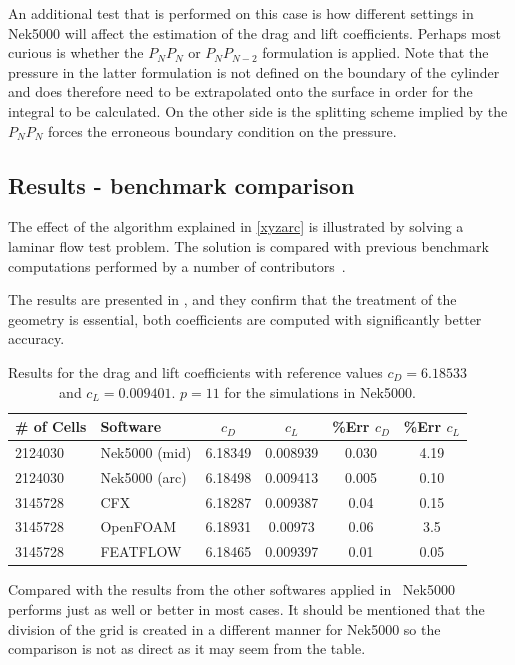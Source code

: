 An additional test that is performed on this case is how different settings in Nek5000 will affect the estimation of the drag and lift coefficients.
Perhaps most curious is whether the $P_NP_N$ or $P_NP_{N-2}$ formulation is applied. Note that the pressure in the latter formulation is 
not defined on the boundary of the cylinder and does therefore need to be extrapolated onto the surface in order for the integral to be 
calculated. On the other side is the splitting scheme implied by the $P_NP_N$ forces the erroneous boundary condition on the pressure.
%
\subsection{Results - benchmark comparison}
The effect of the algorithm explained in \cref{xyzarc} is
illustrated by solving a laminar flow test problem. 
The solution is compared with previous benchmark computations performed by a number of 
contributors~\cite{benchmark}. 

The results are presented in , and they confirm that the treatment of the geometry is 
essential, both coefficients are computed with significantly better accuracy. 
%
\begin{table}[h]
\centering
\begin{tabular}{l l c c c c}
		\toprule
		\# of Cells & Software & $c_D$ & $c_L$ & \%\textbf{Err} $c_D$ &\%\textbf{Err} $c_L$ \\ \midrule 
		2124030& Nek5000 (mid) & 6.18349 & 0.008939 & 0.030 & 4.19 \\ 
		2124030& Nek5000 (arc) & 6.18498 & 0.009413 & 0.005 & 0.10 \\
		3145728 & CFX 		 & 6.18287 & 0.009387 & 0.04 &0.15 \\
		3145728 & OpenFOAM	 & 6.18931 & 0.00973 & 0.06 &3.5 \\
		3145728 & FEATFLOW   & 6.18465 & 0.009397 & 0.01 &0.05 \\
		\bottomrule	
	\end{tabular}
	\caption{Results for the drag and lift coefficients with reference values 
	$c_D = 6.18533$ and $c_L = 0.009401$. $p=11$ for the simulations in Nek5000.}
\label{tab:testcase}
\end{table}
%
Compared with the results from the other softwares applied in~\cite{benchmark} Nek5000 performs 
just as well or better in most cases. It should be mentioned that the division of the grid is created
in a different manner for Nek5000 so the comparison is not as direct as it may seem from the table.

